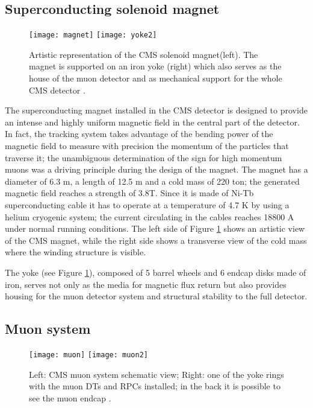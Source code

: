 \subsection{Superconducting solenoid magnet}

\begin{figure}[h!]
  \centering
  \texttt{[image: magnet]}
  \texttt{[image: yoke2]}
  \caption[CMS solenoid magnet]{Artistic representation of the CMS solenoid magnet(left). The magnet is supported on an iron yoke (right) which also serves as the house of the muon detector and as mechanical support for the whole CMS detector \cite{yoke2}.}
  \label{fig:yoke}
\end{figure}

The superconducting magnet installed in the CMS detector is designed to provide an intense and highly uniform magnetic field in the central part of the detector. In fact, the tracking system takes advantage of the bending power of the magnetic field to measure with precision the momentum of the particles that traverse it; the unambiguous determination of the sign for high momentum muons was a driving principle during the design of the magnet. The magnet has a diameter of 6.3 m, a length of 12.5 m and a cold mass of 220 ton; the generated magnetic field reaches a strength of 3.8T. Since it is made of Ni-Tb superconducting cable it has to operate at a temperature of 4.7 K by using a helium cryogenic system; the current circulating in the cables reaches 18800 A under normal running conditions. The left side of Figure \ref{fig:yoke} shows an artistic view of the CMS magnet, while the right side shows a transverse view of the cold mass where the winding structure is visible.

The yoke (see Figure \ref{fig:yoke}), composed of 5 barrel wheels and 6 endcap disks made of iron, serves not only as the media for magnetic flux return but also provides housing for the muon detector system and structural stability to the full detector.     

\subsection{Muon system }

\begin{figure}[h!]
  \centering
  \texttt{[image: muon]}
  \texttt{[image: muon2]}
  \caption[CMS Muon system schematic view]{Left: CMS muon system schematic view; Right: one of the yoke rings with the muon DTs and RPCs installed; in the back it is possible to see the muon endcap \cite{muon}. }
  \label{fig:muon_chambers}
\end{figure}


